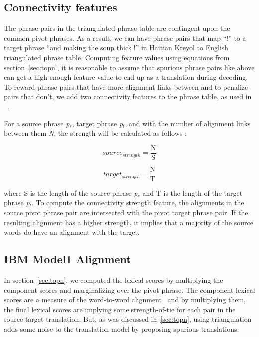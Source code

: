 \subsection{Connectivity features}
\label{subsec:connectivity}
        The phrase pairs in the triangulated phrase table are contingent upon the common pivot phrases. As a result, we can have phrase pairs that map ``!'' to a target phrase ``and making the soup thick !'' in Haitian Kreyol to English triangulated phrase table. Computing feature values using equations from section~\ref{sec:topn}, it is reasonable to assume that spurious phrase pairs like above can get a high enough feature value to end up as a translation during decoding. To reward phrase pairs that have more alignment links between and to penalize pairs that don't, we add two connectivity features to the phrase table, as used in ~\cite{Ahmed:13}.

        For a source phrase \emph{p$_s$}, target phrase \emph{p$_t$}, and with the number of alignment links between them \emph{N}, the strength will be calculated as follows :

        \begin{equation*}
                source_{strength} = \frac{\mathrm{N}}{\mathrm{S}}
        \end{equation*}

        \begin{equation*}
                target_{strength} = \frac{\mathrm{N}}{\mathrm{T}}
        \end{equation*}

        where S is the length of the source phrase \emph{p$_s$} and T is the length of the target phrase \emph{p$_t$}. To compute the connectivity strength feature, the alignments in the source pivot phrase pair are intersected with the pivot target phrase pair. If the resulting alignment has a higher strength, it implies that a majority of the source words do have an alignment with the target.


\subsection{IBM Model1 Alignment}
\label{subsec:model1}

        In section~\ref{sec:topn}, we computed the lexical scores by multiplying the component scores and marginalizing over the pivot phrase. The component lexical scores are a measure of the word-to-word alignment~\cite{Koehn:03} and by multiplying them, the final lexical scores are implying some strength-of-tie for each pair in the source target translation. But, as was discussed in~\ref{sec:topn}, using triangulation adds some noise to the translation model by proposing spurious translations.

